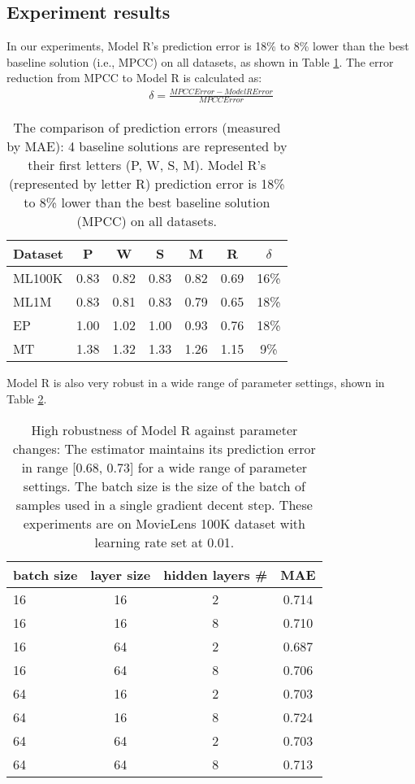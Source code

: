 \documentclass[letterpaper]{article}
\begin{document}
\subsection{Experiment results}
In our experiments, Model R's prediction error is 18\% to 8\% lower than
the best baseline solution (i.e., MPCC) on all datasets, as shown in Table 
\ref{tab:errors}.
The error reduction from MPCC to Model R is calculated as:
\begin{align*}
	\delta = \frac{MPCCError - ModelRError}{MPCCError}
\end{align*}
\begin{table}[!htb]
	\centering
	\caption{The comparison of prediction errors (measured by MAE): 4 baseline
		solutions are represented by their first letters (P, W, S, M).
		Model R's (represented by letter R) prediction error is 18\% to 8\% 
		lower than the best baseline 
		solution (MPCC) on all datasets.
		}
	\begin{tabularx}{0.47\textwidth}{|X|c|c|c|c|c|c|} \hline \rowcolor{blue!50}
		Dataset & P    & W    & S    & M    & R    & $ \delta $ \\ \hline
		ML100K  & 0.83 & 0.82 & 0.83 & 0.82 & 0.69 & 16\% \\ \hline
		ML1M    & 0.83 & 0.81 & 0.83 & 0.79 & 0.65 & 18\% \\ \hline
		EP      & 1.00 & 1.02 & 1.00 & 0.93 & 0.76 & 18\% \\ \hline
		MT      & 1.38 & 1.32 & 1.33 & 1.26 & 1.15 & 9\%  \\ \hline
	\end{tabularx}
	\label{tab:errors}
\end{table}
Model R is also very robust in a wide range of parameter settings, shown in 
Table \ref{tab:robust}.
\begin{table}[!htb]
	\centering
	\caption{High robustness of Model R against parameter changes:
		The estimator maintains its prediction error in range [0.68, 0.73] for 
		a wide range of parameter settings. The batch size is the size of the 
		batch of samples used in a single gradient decent step.
		These experiments are on MovieLens 100K dataset with learning rate set 
		at 0.01.
	}
	\begin{tabularx}{0.47\textwidth}{|X|c|c|c|}  \hline \rowcolor{blue!50}
		 batch size & layer size & hidden layers \# & MAE \\ \hline
		 16 & 16 & 2 & 0.714 \\ \hline
		 16 & 16 & 8 & 0.710 \\ \hline
		 16 & 64 & 2 & 0.687 \\ \hline
		 16 & 64 & 8 & 0.706 \\ \hline
		 64 & 16 & 2 & 0.703 \\ \hline
		 64 & 16 & 8 & 0.724 \\ \hline
		 64 & 64 & 2 & 0.703 \\ \hline
		 64 & 64 & 8 & 0.713 \\ \hline
	\end{tabularx}
	\label{tab:robust}
\end{table}
\end{document}
